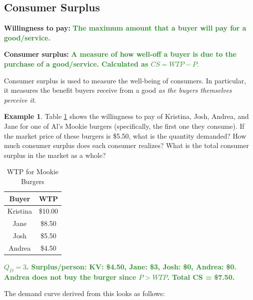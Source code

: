 \documentclass[11pt]{article}\usepackage[]{graphicx}\usepackage[]{color}
\theoremstyle{definition}
\newtheorem{exmp}{Example}[section]
\newcommand{\ddp}[1]{{\textbf{\textcolor{ForestGreen}{#1}}}}
\newcommand{\defn}[1]{\textbf{#1}}
\begin{document}
	\subsection{Consumer Surplus}
	
	\defn{Willingness to pay:} \ddp{The maximum amount that a buyer will pay for a good/service.\\}
	
	\defn{Consumer surplus:} \ddp{A measure of how well-off a buyer is due to the purchase of a good/service. Calculated as $CS = WTP - P.$ \\}
	
	Consumer surplus is used to measure the well-being of consumers. In particular, it measures the benefit buyers receive from a good \textit{as the buyers themselves perceive it}.
	\\
	
	\begin{exmp} 
		Table \ref{mookie} shows the willingness to pay of Kristina, Josh, Andrea, and Jane for one of Al's Mookie burgers (specifically, the first one they consume). If the market price of these burgers is \$5.50, what is the quantity demanded? How much consumer surplus does each consumer realizes? What is the total consumer surplus in the market as a whole?
	
	\begin{table}[ht]
		\caption{WTP for Mookie Burgers}
		\label{mookie}
		\centering
		\begin{tabular}{  c|c}        
			
			Buyer   & WTP \\
			\hline
			Kristina & \$10.00 \\
			Jane & \$8.50 \\
			Josh & \$5.50 \\
			Andrea & \$4.50 \\
		\end{tabular}
	\end{table} 
	\end{exmp}
	\ddp{$Q_D = 3$. Surplus/person: KV: \$4.50, Jane: \$3, Josh: \$0, Andrea: \$0. Andrea does not buy the burger since $P>WTP$. Total CS = \$7.50.\\}
	
	The demand curve derived from this looks as follows:
\end{document}
